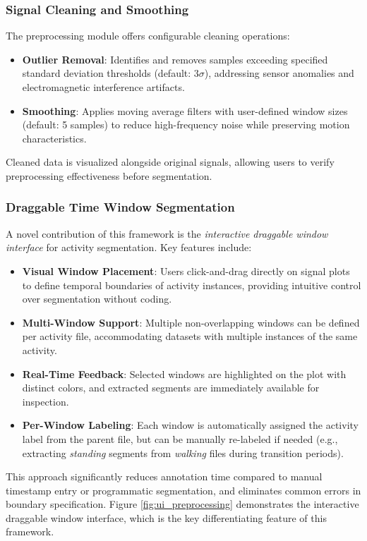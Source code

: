 \subsubsection{Signal Cleaning and Smoothing}
The preprocessing module offers configurable cleaning operations:
\begin{itemize}
    \item \textbf{Outlier Removal}: Identifies and removes samples exceeding specified standard deviation thresholds (default: $3\sigma$), addressing sensor anomalies and electromagnetic interference artifacts.
    \item \textbf{Smoothing}: Applies moving average filters with user-defined window sizes (default: 5 samples) to reduce high-frequency noise while preserving motion characteristics.
\end{itemize}
Cleaned data is visualized alongside original signals, allowing users to verify preprocessing effectiveness before segmentation.

\subsubsection{Draggable Time Window Segmentation}
A novel contribution of this framework is the \textit{interactive draggable window interface} for activity segmentation. Key features include:
\begin{itemize}
    \item \textbf{Visual Window Placement}: Users click-and-drag directly on signal plots to define temporal boundaries of activity instances, providing intuitive control over segmentation without coding.
    \item \textbf{Multi-Window Support}: Multiple non-overlapping windows can be defined per activity file, accommodating datasets with multiple instances of the same activity.
    \item \textbf{Real-Time Feedback}: Selected windows are highlighted on the plot with distinct colors, and extracted segments are immediately available for inspection.
    \item \textbf{Per-Window Labeling}: Each window is automatically assigned the activity label from the parent file, but can be manually re-labeled if needed (e.g., extracting \textit{standing} segments from \textit{walking} files during transition periods).
\end{itemize}
This approach significantly reduces annotation time compared to manual timestamp entry or programmatic segmentation, and eliminates common errors in boundary specification. Figure \ref{fig:ui_preprocessing} demonstrates the interactive draggable window interface, which is the key differentiating feature of this framework.

